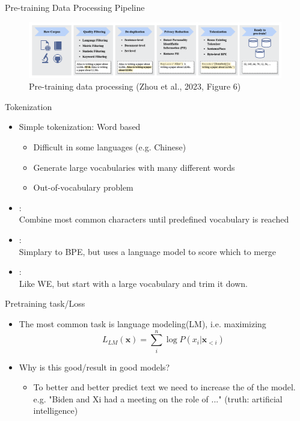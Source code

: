 \documentclass[10pt]{beamer}
\begin{document}
\begin{frame}{Pre-training Data Processing Pipeline}

\begin{figure}[h]
\centering
\includegraphics[width=0.99\textwidth]{fig/zhou_2023_fig6}
\caption{Pre-training data processing (Zhou et al., 2023, Figure 6)}
\end{figure}

\end{frame}



\begin{frame}{Tokenization}
\begin{itemize}
\item Simple tokenization: Word based
\pause
\begin{itemize}
\item Difficult in some languages (e.g. Chinese)
\pause
\item Generate large vocabularies with many different words
\pause
\item Out-of-vocabulary problem
\pause
\end{itemize}
\item {}: \\Combine most common characters until predefined vocabulary is reached
\pause
\item {}: \\Simplary to BPE, but uses a language model to score which to merge
\pause
\item {}: \\Like WE, but start with a large vocabulary and trim it down.
\end{itemize}

\end{frame}

\begin{frame}{Pretraining task/Loss}

\begin{itemize}
\item The most common task is language modeling(LM), i.e. maximizing
\[
L_{LM}(\mathbf{x}) = \sum_i^n \log P(x_i | \mathbf{x}_{<i})
\]
\item Why is this good/result in good models?\pause
\begin{itemize}
\item To better and better predict text we need to increase the  of the model. \\ e.g. "Biden and Xi had a meeting on the role of ..." (truth: artificial intelligence)
\end{itemize}
\end{itemize}


\end{frame}
\end{document}
